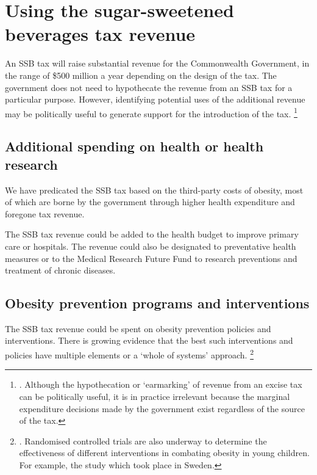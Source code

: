 \documentclass[embargoed]{grattan}
\begin{document}
\chapter{Using the sugar-sweetened beverages tax revenue }\label{using-the-sugar-sweetened-beverages-tax-revenue}

An SSB tax will raise substantial revenue for the Commonwealth Government, in the range of \$500 million a year depending on the design of the tax.
The government does not need to hypothecate the revenue from an SSB tax for a particular purpose.
However, identifying potential uses of the additional revenue may be politically useful to generate support for the introduction of the tax.%
\footnote{\textcites{Freebairn2010Taxationobesity}{Organization2016FiscalPoliciesDiet}{CnossenExcisetaxationAustralia}.
Although the hypothecation or `earmarking' of revenue from an excise tax can be politically useful, it is in practice irrelevant because the marginal expenditure decisions made by the government exist regardless of the source of the tax.}

\section{Additional spending on health or health research}\label{additional-spending-on-health-or-health-research}

We have predicated the SSB tax based on the third-party costs of obesity, most of which are borne by the government through higher health expenditure and foregone tax revenue.

The SSB tax revenue could be added to the health budget to improve primary care or hospitals.
The revenue could also be designated to preventative health measures or to the Medical Research Future Fund to research preventions and treatment of chronic diseases.

\section{Obesity prevention programs and interventions }\label{obesity-prevention-programs-and-interventions}

The SSB tax revenue could be spent on obesity prevention policies and interventions.
There is growing evidence that the best such interventions and policies have multiple elements or a `whole of systems' approach.%
\footnote{\textcites{Ewart-Pierce2016WholeCommunityObesity}{Health2016Insufficientphysicalactivity}{Hawkes2015Smartfoodpolicies}{Organization2016FiscalPoliciesDiet}{Roberto2012Factsfrontversus}{Mckinsey2014overcomingobesity}.
Randomised controlled trials are also underway to determine the effectiveness of different interventions in combating obesity in young children.
For example, the \textcite{Sobko2011randomisedcontrolledtrial} study which took place in Sweden.}
\end{document}
